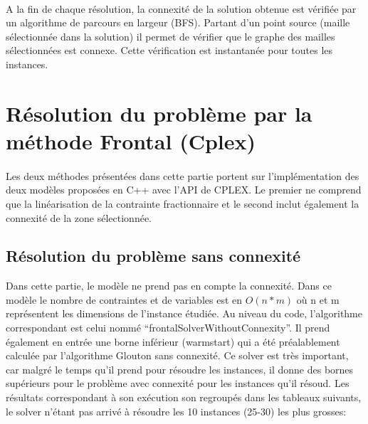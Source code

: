 \documentclass[a4paper, 11pt]{article} %
\begin{document}
\paragraph*{}
A la fin de chaque résolution, la connexité de la solution obtenue est vérifiée par un algorithme de parcours en largeur (BFS). Partant d'un point source (maille sélectionnée dans la solution) il permet de vérifier que le graphe des mailles sélectionnées est connexe. Cette vérification est instantanée pour toutes les instances.


\section{Résolution du problème par la méthode Frontal (Cplex)}

\paragraph*{}
Les deux méthodes présentées dans cette partie portent sur l'implémentation des deux modèles proposées en C++ avec l'API de CPLEX. Le premier ne comprend que la linéarisation de la contrainte fractionnaire et le second inclut également la connexité de la zone sélectionnée.

\subsection{Résolution du problème sans connexité}

Dans cette partie, le modèle ne prend pas en compte la connexité. Dans ce modèle le nombre de contraintes et de variables est en $O(n*m)$ où n et m représentent les dimensions de l'instance étudiée. Au niveau du code, l'algorithme correspondant est celui nommé ``frontalSolverWithoutConnexity''. Il prend également en entrée une borne inférieur (warmstart) qui a été préalablement calculée par l'algorithme Glouton sans connexité. Ce solver est très important, car malgré le temps qu'il prend pour résoudre les instances, il donne des bornes supérieurs pour le problème avec connexité pour les instances qu'il résoud. Les résultats correspondant à son exécution son regroupés dans les tableaux suivants, le solver n'étant pas arrivé à résoudre les 10 instances (25-30) les plus grosses:
\end{document}
